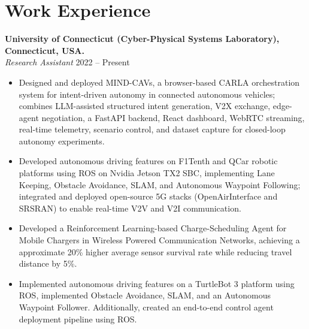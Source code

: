 \section*{Work Experience}
\vspace{-0.05in}
\textbf{University of Connecticut (Cyber-Physical Systems Laboratory), Connecticut, USA.} \\
\textit{Research Assistant} \hfill 2022 – Present
\begin{itemize}[noitemsep,nolistsep]
    \item Designed and deployed MIND-CAVs, a browser-based CARLA orchestration system for intent-driven autonomy in connected autonomous vehicles; combines LLM-assisted structured intent generation, V2X exchange, edge-agent negotiation, a FastAPI backend, React dashboard, WebRTC streaming, real-time telemetry, scenario control, and dataset capture for closed-loop autonomy experiments.
    \item Developed autonomous driving features on F1Tenth and QCar robotic platforms using ROS on Nvidia Jetson TX2 SBC, implementing Lane Keeping, Obstacle Avoidance, SLAM, and Autonomous Waypoint Following; integrated and deployed open-source 5G stacks (OpenAirInterface and SRSRAN) to enable real-time V2V and V2I communication.
    \item Developed a Reinforcement Learning-based Charge-Scheduling Agent for Mobile Chargers in Wireless Powered Communication Networks, achieving a approximate 20\% higher average sensor survival rate while reducing travel distance by 5\%.
    \item Implemented autonomous driving features on a TurtleBot 3 platform using ROS, implemented Obstacle Avoidance, SLAM, and an Autonomous Waypoint Follower. Additionally, created an end-to-end control agent deployment pipeline using ROS.
\end{itemize}

